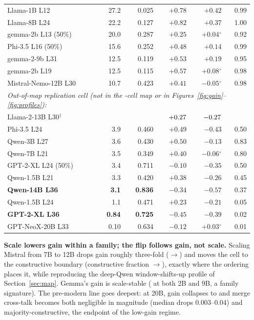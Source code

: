 \documentclass[preprint,12pt]{elsarticle}
\theoremstyle{definition}
\begin{document}
\begin{table}[t]
{\begin{tabular}{lrrrrr}
Llama-1B L12        & 27.2 & 0.025 & $+0.78$ & $+0.42$ & 0.99 \\
Llama-8B L24        & 22.2 & 0.127 & $+0.82$ & $+0.37$ & 1.00 \\
gemma-2b L13 (50\%) & 20.0 & 0.287 & $+0.25$ & $+0.04$$^{\circ}$ & 0.92 \\
Phi-3.5 L16 (50\%)  & 15.6 & 0.252 & $+0.48$ & $+0.14$ & 0.99 \\
gemma-2-9b L31      & 12.5 & 0.119 & $+0.53$ & $+0.19$ & 0.95 \\
gemma-2b L19        & 12.5 & 0.115 & $+0.57$ & $+0.08$$^{\circ}$ & 0.98 \\
Mistral-Nemo-12B L30 & 10.7 & 0.423 & $+0.41$ & $-0.05$$^{\circ}$ & 0.98 \\
\midrule
\multicolumn{6}{l}{\emph{Out-of-map replication cell (not in the \nCells{}-cell map or in
Figures~\ref{fig:gain}--\ref{fig:profiles}):}}\\
Llama-2-13B L30$^{\dagger}$ & \gainThirteenB{} & \fracThirteenB{} & $+0.27{}$ & $-0.27{}$ & \esrThirteenB{} \\
\midrule
Phi-3.5 L24         & 3.9  & 0.460 & $+0.49$ & $-0.43$ & 0.50 \\
Qwen-3B L27         & 3.6  & 0.430 & $+0.50$ & $-0.13$ & 0.83 \\
Qwen-7B L21         & 3.5  & 0.349 & $+0.40$ & $-0.06$$^{\circ}$ & 0.80 \\
GPT-2-XL L24 (50\%) & 3.4  & 0.711 & $-0.10$ & $-0.35$ & 0.50 \\
Qwen-1.5B L21       & 3.3  & 0.420 & $+0.38$ & $-0.26$ & 0.45 \\
\textbf{Qwen-14B L36} & \textbf{3.1} & \textbf{0.836} & \textbf{$-0.34$} & $-0.57$ & 0.37 \\
Qwen-1.5B L24       & 1.1  & 0.471 & $+0.23$ & $-0.21$ & 0.05 \\
\textbf{GPT-2-XL L36} & \textbf{0.84} & \textbf{0.725} & \textbf{$-0.45$} & $-0.39$ & 0.02 \\
GPT-NeoX-20B L33    & 0.10 & 0.634 & $-0.12$ & $+0.03$$^{\circ}$ & 0.01 \\
\bottomrule
\end{tabular}
}
\end{table}

\textbf{Scale lowers gain within a family; the flip follows gain, not scale.} Scaling
Mistral from 7B to 12B drops gain roughly three-fold (\gainMistralSevenB{}$\to$\gainNemoTwelveB{})
and moves the cell to the constructive boundary (constructive fraction
\fracMistralSevenB{}$\to$\fracNemoTwelveB{}), exactly where the ordering places it, while
reproducing the deep-Qwen window-shifts-up profile of Section~\ref{sec:map}. Gemma's gain is
scale-stable (\gainGemmaNineB{} at both 2B and 9B, a family signature). The pre-modern line
goes deepest: at 20B, gain collapses to \gainNeoxTwentyB{} and merge cross-talk becomes both
negligible in magnitude (median drops 0.003--0.04) and majority-constructive, the endpoint of
the low-gain regime.
\end{document}
